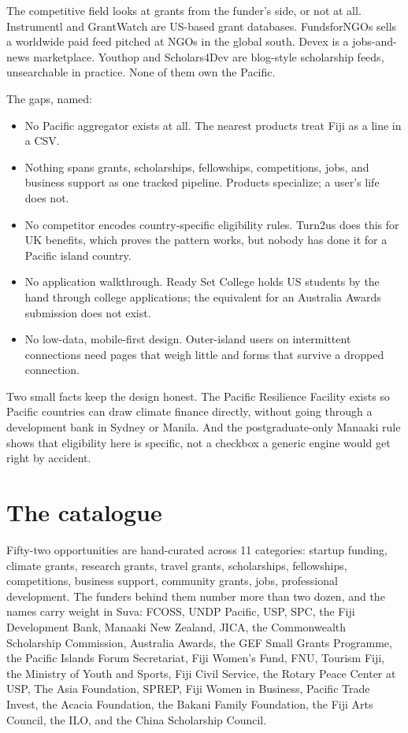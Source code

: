\documentclass[11pt]{article}
\begin{document}
The competitive field looks at grants from the funder's side, or not at all. Instrumentl and GrantWatch are US-based grant databases. FundsforNGOs sells a worldwide paid feed pitched at NGOs in the global south. Devex is a jobs-and-news marketplace. Youthop and Scholars4Dev are blog-style scholarship feeds, unsearchable in practice. None of them own the Pacific.

The gaps, named:

\begin{itemize}
\item No Pacific aggregator exists at all. The nearest products treat Fiji as a line in a CSV.
\item Nothing spans grants, scholarships, fellowships, competitions, jobs, and business support as one tracked pipeline. Products specialize; a user's life does not.
\item No competitor encodes country-specific eligibility rules. Turn2us does this for UK benefits, which proves the pattern works, but nobody has done it for a Pacific island country.
\item No application walkthrough. Ready Set College holds US students by the hand through college applications; the equivalent for an Australia Awards submission does not exist.
\item No low-data, mobile-first design. Outer-island users on intermittent connections need pages that weigh little and forms that survive a dropped connection.
\end{itemize}

Two small facts keep the design honest. The Pacific Resilience Facility exists so Pacific countries can draw climate finance directly, without going through a development bank in Sydney or Manila. And the postgraduate-only Manaaki rule shows that eligibility here is specific, not a checkbox a generic engine would get right by accident.

\section{The catalogue}

Fifty-two opportunities are hand-curated across 11 categories: startup funding, climate grants, research grants, travel grants, scholarships, fellowships, competitions, business support, community grants, jobs, professional development. The funders behind them number more than two dozen, and the names carry weight in Suva: FCOSS, UNDP Pacific, USP, SPC, the Fiji Development Bank, Manaaki New Zealand, JICA, the Commonwealth Scholarship Commission, Australia Awards, the GEF Small Grants Programme, the Pacific Islands Forum Secretariat, Fiji Women's Fund, FNU, Tourism Fiji, the Ministry of Youth and Sports, Fiji Civil Service, the Rotary Peace Center at USP, The Asia Foundation, SPREP, Fiji Women in Business, Pacific Trade Invest, the Acacia Foundation, the Bakani Family Foundation, the Fiji Arts Council, the ILO, and the China Scholarship Council.
\end{document}
